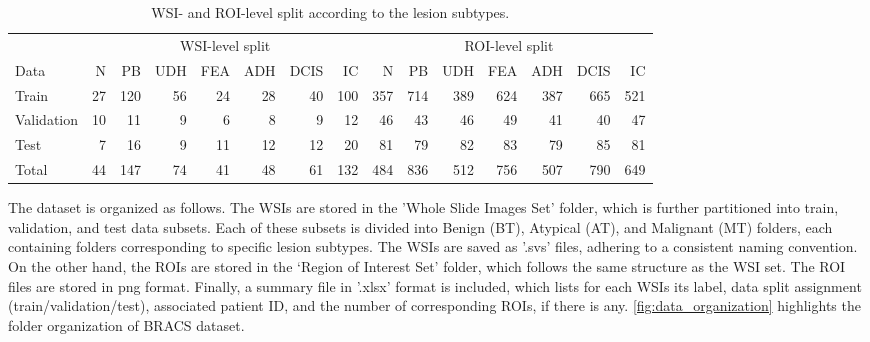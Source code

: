 \documentclass[
11pt, %
english, %
singlespacing, %
headsepline, %
]{project_structure}
\begin{document}
\begin{table}[ht]
    \centering
    \small
    \begin{adjustbox}{max width=\textwidth} %
        \begin{tabular}{@{}l|rrrrrrr|rrrrrrr@{}}
            \toprule
            & \multicolumn{7}{c|}{\acrshort{WSI}-level split} & \multicolumn{7}{c}{\acrshort{ROI}-level split} \\
            \cmidrule(l){2-8} \cmidrule(l){9-15}
            Data & \acrshort{N} & \acrshort{PB} & \acrshort{UDH} & \acrshort{FEA} & \acrshort{ADH} & \acrshort{DCIS} & \acrshort{IC} & \acrshort{N} & \acrshort{PB} & \acrshort{UDH} & \acrshort{FEA} & \acrshort{ADH} & \acrshort{DCIS} & \acrshort{IC} \\
            \midrule
            Train & 27 & 120 & 56 & 24 & 28 & 40 & 100 & 357 & 714 & 389 & 624 & 387 & 665 & 521 \\
            Validation & 10 & 11 & 9 & 6 & 8 & 9 & 12 & 46 & 43 & 46 & 49 & 41 & 40 & 47 \\
            Test & 7 & 16 & 9 & 11 & 12 & 12 & 20 & 81 & 79 & 82 & 83 & 79 & 85 & 81 \\
            \midrule
            Total & 44 & 147 & 74 & 41 & 48 & 61 & 132 & 484 & 836 & 512 & 756 & 507 & 790 & 649 \\
            \bottomrule
        \end{tabular}
    \end{adjustbox}
    \caption{\acrshort{WSI}- and \acrshort{ROI}-level split according to the lesion subtypes.}
    \label{tab:splits2_distribution}
\end{table}

\noindent The dataset is organized as follows. The \acrshort{WSI}s are stored in the 'Whole Slide Images Set' folder, which is further partitioned into train, validation, and test data subsets. Each of these subsets is divided into Benign (\acrshort{BT}), Atypical (\acrshort{AT}), and Malignant (\acrshort{MT}) folders, each containing folders corresponding to specific lesion subtypes. The \acrshort{WSI}s are saved as '.svs' files, adhering to a consistent naming convention. \\
On the other hand, the \acrshort{ROI}s are stored in the ‘Region of Interest Set’ folder, which follows the same structure as the \acrshort{WSI} set. The \acrshort{ROI} files are stored in png format. Finally, a summary file in '.xlsx' format is included, which lists for each \acrshort{WSI}s its label, data split assignment (train/validation/test), associated patient \acrshort{ID}, and the number of corresponding \acrshort{ROI}s, if there is any. \autoref{fig:data_organization} highlights the folder organization of \acrshort{BRACS} dataset.
\end{document}
